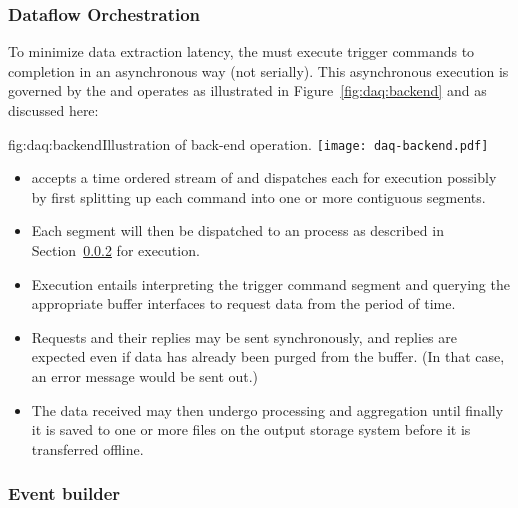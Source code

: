 \subsubsection{Dataflow Orchestration}

To minimize data extraction latency, the  must execute
trigger commands to completion in an asynchronous way (not serially). 
This asynchronous execution is governed by the  and operates as illustrated in Figure~\ref{fig:daq:backend} and as discussed here:

\begin{dunefigure}{fig:daq:backend}{Illustration of   back-end operation.}
  \texttt{[image: daq-backend.pdf]}
\end{dunefigure}

\begin{itemize}
\item {} accepts a time ordered stream of  and dispatches each for execution possibly by first splitting up each command into one or more contiguous segments.
\item Each segment will then be dispatched to an  process as described in Section~\ref{sec:fd-daq:design-event-builder} for execution.
\item Execution entails interpreting the trigger command segment and querying the appropriate  buffer interfaces to request data from the period of time. 
\item Requests and their replies may be sent synchronously, and
  replies are expected even if data has already been purged from the
   buffer. (In that case, an error message would be sent out.)
\item The data received may then undergo processing and aggregation
  until finally it is saved to one or more files on the output storage
  system before it is transferred offline.
\end{itemize}



\subsubsection{Event builder}
\label{sec:fd-daq:design-event-builder}

